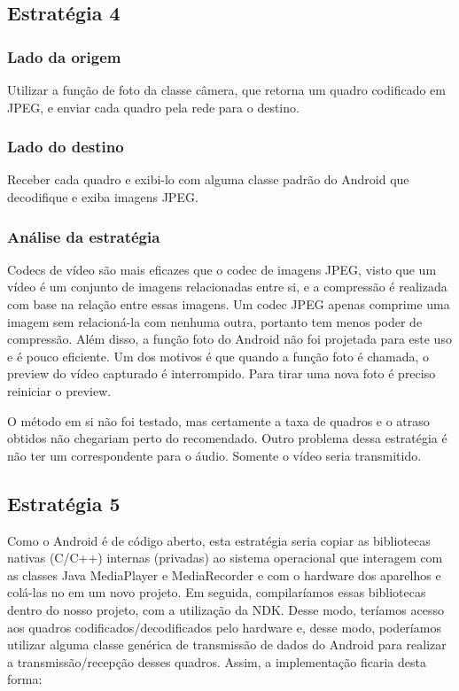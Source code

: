 \documentclass{acm_proc_article-sp}
\begin{document}
\subsection{Estratégia 4}

\subsubsection{Lado da origem}

Utilizar a função de foto da classe câmera, que retorna um quadro codificado em JPEG, e enviar cada quadro pela rede para o destino.

\subsubsection{Lado do destino}

Receber cada quadro e exibi-lo com alguma classe padrão do Android que decodifique e exiba imagens JPEG.

\subsubsection{Análise da estratégia}

Codecs de vídeo são mais eficazes que o codec de imagens JPEG, visto que um vídeo é um conjunto de imagens relacionadas entre si, e a compressão é realizada com base na relação entre essas imagens. Um codec JPEG apenas comprime uma imagem sem relacioná-la com nenhuma outra, portanto tem menos poder de compressão. Além disso, a função foto do Android não foi projetada para este uso e é pouco eficiente. Um dos motivos é que quando a função foto é chamada, o preview do vídeo capturado é interrompido. Para tirar uma nova foto é preciso reiniciar o preview.

O método em si não foi testado, mas certamente a taxa de quadros e o atraso obtidos não chegariam perto do recomendado. Outro problema dessa estratégia é não ter um correspondente para o áudio. Somente o vídeo seria transmitido.

\subsection{Estratégia 5}
Como o Android é de código aberto, esta estratégia seria copiar as bibliotecas nativas (C/C++) internas (privadas) ao sistema operacional que interagem com as classes Java MediaPlayer e MediaRecorder e com o hardware dos aparelhos e colá-las no em um novo projeto. Em seguida, compilaríamos essas bibliotecas dentro do nosso projeto, com a utilização da NDK. Desse modo, teríamos acesso aos quadros codificados/decodificados pelo hardware e, desse modo, poderíamos utilizar alguma classe genérica de transmissão de dados do Android para realizar a transmissão/recepção desses quadros. Assim, a implementação ficaria desta forma:
\end{document}
